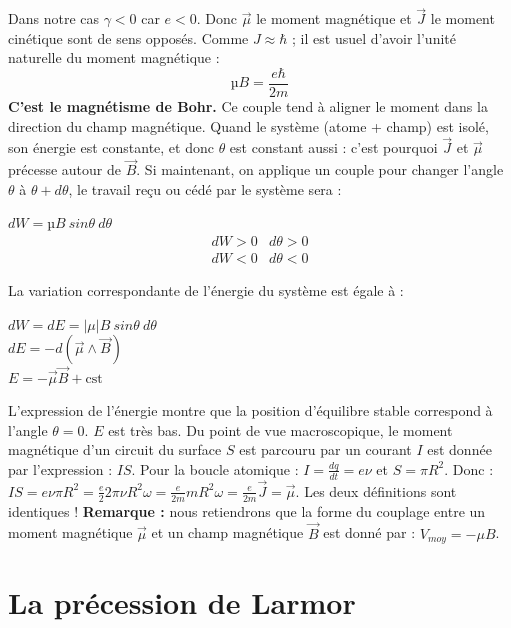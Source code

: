 \documentclass[12pt,a4paper,titlepage]{book}
\begin{document}
Dans notre cas $\gamma < 0$ car $e < 0$. Donc $\overrightarrow{\mu}$ le moment magnétique et $\overrightarrow{J}$ le moment cinétique sont de sens opposés. Comme $J \approx \hbar$ ; il est usuel d'avoir l'unité naturelle du moment magnétique :
\begin{equation*}
µB = \frac{e \hbar}{2m}
\end{equation*}
\textbf{C'est le magnétisme de Bohr.} Ce couple tend à aligner le moment dans la direction du champ magnétique. Quand le système (atome + champ) est isolé, son énergie est constante, et donc $\theta$ est constant aussi : c'est pourquoi $\overrightarrow{J}$ et $\overrightarrow{\mu}$ précesse autour de $\overrightarrow{B}$. Si maintenant, on applique un couple pour changer l'angle $\theta$ à $\theta + d\theta$, le travail reçu ou cédé par le système sera :
\begin{center}
$dW = µB ~sin \theta ~d\theta$
\[
\begin{matrix}
dW > 0 & d\theta > 0\\
dW < 0 & d\theta < 0
\end{matrix}
\]
\end{center}
La variation correspondante de l'énergie du système est égale à :
\begin{center}
$dW = dE = \vert \mu \vert B ~sin\theta ~d\theta$\\
$dE = -d(\overrightarrow{\mu} \wedge \overrightarrow{B})$\\
$E = -\overrightarrow{\mu} \overrightarrow{B} + \text{cst}$
\end{center}
L'expression de l'énergie montre que la position d'équilibre stable correspond à l'angle $\theta = 0$. $E$ est très bas. Du point de vue macroscopique, le moment magnétique d'un circuit du surface $S$ est parcouru par un courant $I$ est donnée par l'expression : $IS$. Pour la boucle atomique : $I = \frac{dq}{dt} = e \nu$ et $S = \pi R^2$. Donc : $IS = e \nu \pi R^2 = \frac{e}{2} 2 \pi \nu R^2 \omega = \frac{e}{2m} m R^2 \omega = \frac{e}{2m} \overrightarrow{J} = \overrightarrow{\mu}$. Les deux définitions sont identiques ! \textbf{Remarque :} nous retiendrons que la forme du couplage entre un moment magnétique $\overrightarrow{\mu}$ et un champ magnétique $\overrightarrow{B}$ est donné par : $V_{moy} = -\mu B$. 

\section{La précession de Larmor}
\end{document}
